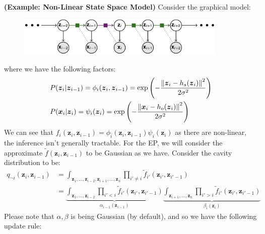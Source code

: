\begin{remark}{\textbf{(Example: Non-Linear State Space Model)}}
    Consider the graphical model: 
    \begin{figure}[H]
        \centering
        \includegraphics[width=10cm]{img/img14.png}
    \end{figure}  
    where we have the following factors:
    \begin{equation*}
    \begin{aligned}
        &P(\boldsymbol z_i | \boldsymbol z_{i-1}) = \phi_i(\boldsymbol z_i, \boldsymbol z_{i-1}) = \exp\left( -\frac{\left\lVert\boldsymbol z_i - h_s(\boldsymbol z_i)\right\rVert^2}{2\sigma^2} \right) \\
        &P(\boldsymbol x_i | \boldsymbol z_i) = \psi_i(\boldsymbol z_i) = \exp\left( -\frac{\left\lVert\boldsymbol x_i - h_o(\boldsymbol z_i)\right\rVert^2}{2\sigma^2} \right)
    \end{aligned}
    \end{equation*}
    We can see that $f_i(\boldsymbol z_i, \boldsymbol z_{i-1}) = \phi_i(\boldsymbol z_i, \boldsymbol z_{i-1})\psi_i(\boldsymbol z_i)$ as there are non-linear, the inference isn't generally tractable. For the EP, we will consider the approximate $\tilde{f}(\boldsymbol z_i, \boldsymbol z_{i-1})$ to be Gaussian as we have. Consider the cavity distribution to be:
    \begin{equation*}
    \begin{aligned}
        q_{\neg i}(\boldsymbol z_i, \boldsymbol z_{i-1}) &= \int_{\boldsymbol z_1,\dots,\boldsymbol z_{i-2}, \boldsymbol z_{i+1}, \dots, \boldsymbol z_n} \prod_{i'\ne i}\tilde{f}_{i'}(\boldsymbol z_{i'}, \boldsymbol z_{i'-1}) \\
        &= \underbrace{\int_{\boldsymbol z_1,\dots,\boldsymbol z_{i-2}}\prod_{i'<i} \tilde{f}_{i'}(\boldsymbol z_{i'}, \boldsymbol z_{i'-1})}_{\alpha_{i-1}(\boldsymbol z_{i-1})}\underbrace{\int_{\boldsymbol z_{i+1},\dots,\boldsymbol z_n}\prod_{i'>i} \tilde{f}_{i'}(\boldsymbol z_{i'}, \boldsymbol z_{i'-1})}_{\beta_i(\boldsymbol z_i)}
    \end{aligned}
    \end{equation*}
    Please note that $\alpha, \beta$ is being Gaussian (by default), and so we have the following update rule:
    \begin{equation*}

\end{equation*}
\end{remark}
